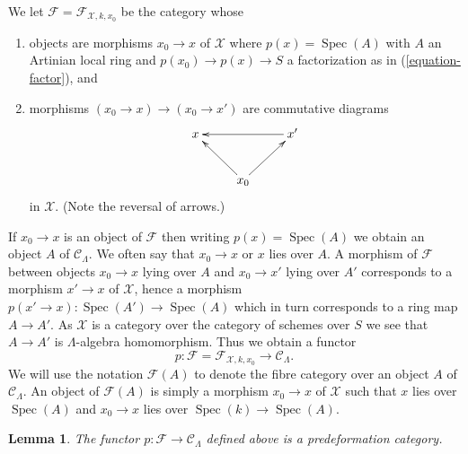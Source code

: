 \documentclass{stacks-project}
\theoremstyle{plain}
\newtheorem{lemma}[subsection]{Lemma}
\theoremstyle{definition}
\theoremstyle{remark}
\numberwithin{equation}{subsection}
\def\Spec{\mathop{\mathrm{Spec}}}
\begin{document}
\medskip\noindent
We let $\mathcal{F} = \mathcal{F}_{\mathcal{X}, k, x_0}$ be the
category whose
\begin{enumerate}
\item objects are morphisms $x_0 \to x$ of $\mathcal{X}$ where
$p(x) = \Spec(A)$ with $A$ an Artinian local ring and
$p(x_0) \to p(x) \to S$ a factorization as in (\ref{equation-factor}), and
\item morphisms $(x_0 \to x) \to (x_0 \to x')$ are commutative
diagrams
$$
\xymatrix{
x & & x' \ar[ll] \\
& x_0 \ar[lu] \ar[ru]
}
$$
in $\mathcal{X}$. (Note the reversal of arrows.)
\end{enumerate}
If $x_0 \to x$ is an object of $\mathcal{F}$ then writing $p(x) = \Spec(A)$
we obtain an object $A$ of $\mathcal{C}_\Lambda$. We often say that
$x_0 \to x$ or $x$ lies over $A$. A morphism of $\mathcal{F}$ between objects
$x_0 \to x$ lying over $A$ and $x_0 \to x'$ lying over $A'$
corresponds to a morphism $x' \to x$ of $\mathcal{X}$, hence a morphism
$p(x' \to x) : \Spec(A') \to \Spec(A)$ which in turn corresponds to a
ring map $A \to A'$. As $\mathcal{X}$ is a category
over the category of schemes over $S$ we see that $A \to A'$ is
$\Lambda$-algebra homomorphism. Thus we obtain a functor
\begin{equation}
\label{equation-predeformation-category}
p : \mathcal{F} = \mathcal{F}_{\mathcal{X}, k, x_0}
\longrightarrow
\mathcal{C}_\Lambda.
\end{equation}
We will use the notation $\mathcal{F}(A)$ to denote the fibre category
over an object $A$ of $\mathcal{C}_\Lambda$. An object of $\mathcal{F}(A)$
is simply a morphism $x_0 \to x$ of $\mathcal{X}$ such that
$x$ lies over $\Spec(A)$ and $x_0 \to x$ lies over $\Spec(k) \to \Spec(A)$.

\begin{lemma}
\label{lemma-predeformation-category}
The functor $p : \mathcal{F} \to \mathcal{C}_\Lambda$ defined above
is a predeformation category.
\end{lemma}
\end{document}
